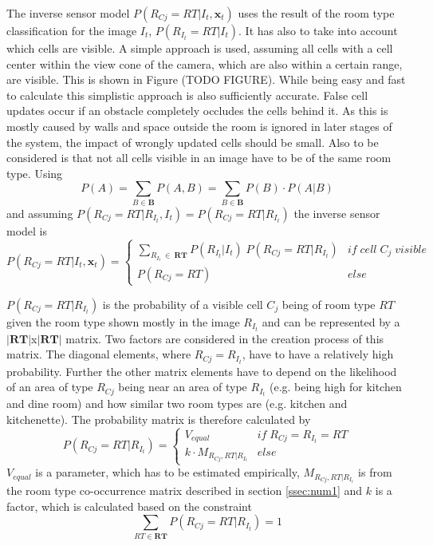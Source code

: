 The inverse sensor model $P(R_{Cj}=RT|I_t,\mathbf{x}_{t})$ uses the result of the room type classification for the image $I_t$, $P(R_{I_{t} }=RT|I_t)$. It has also to take into account which cells are visible. A simple approach is used, assuming all cells with a cell center within the view cone of the camera, which are also within a certain range, are visible. This is shown in Figure (TODO FIGURE). While being easy and fast to calculate this simplistic approach is also sufficiently accurate. False cell updates occur if an obstacle completely occludes the cells behind it. As this is mostly caused by walls and space outside the room is ignored in later stages of the system, the impact of wrongly updated cells should be small. Also to be considered is that not all cells visible in an image have to be of the same room type. Using 
\begin{equation}
 P(A) =  \sum_{B \in \mathbf{B}} P(A,B) = \sum_{B \in \mathbf{B}} P(B)\cdot P(A|B)
\end{equation}
and assuming $P(R_{Cj}=RT|R_{I_{t}}, I_t) = P(R_{Cj}=RT|R_{I_{t}})$ the inverse sensor model is
\begin{equation}
 P(R_{Cj}=RT|I_t,\mathbf{x}_{t}) = \begin{cases}\sum_{R_{I_{t} }\:\in \: \mathbf{RT}} P(R_{I_{t} }|I_t) \; P(R_{Cj}=RT|R_{I_{t}})  & if \;cell \; C_j \; visible\\P(R_{Cj}=RT) & else\end{cases}
\end{equation}

$P(R_{Cj}=RT|R_{I_{t} })$ is the probability of a visible cell $C_j$ being of room type $RT$ given the room type shown mostly in the image $R_{I_{t}}$ and can be represented by a $|\mathbf{RT}|$x$|\mathbf{RT}|$ matrix. Two factors are considered in the creation process of this matrix. The diagonal elements, where $R_{Cj}=R_{I_{t}}$, have to have a relatively high probability. Further the other matrix elements have to depend on the likelihood of an area of type $R_{Cj}$ being near an area of type $R_{I_{t}}$ (e.g. being high for kitchen and dine room) and how similar two room types are (e.g. kitchen and kitchenette). The probability matrix is therefore calculated by
\begin{equation}
 P(R_{Cj}=RT|R_{I_{t} }) = \begin{cases} V_{equal} & if \; R_{Cj}=R_{I_{t}}=RT \\ k\cdot M_{R_{Cj},RT|R_{I_{t}}} & else \end{cases}
\end{equation}
$V_{equal}$ is a parameter, which has to be estimated empirically, $M_{R_{Cj},RT|R_{I_{t}}}$ is from the room type co-occurrence matrix described in section \ref{ssec:num1} and $k$ is a factor, which is calculated based on the constraint
\begin{equation}
 \sum_{RT \in \mathbf{RT}} P(R_{Cj}=RT|R_{I_{t}})=1 
\end{equation}